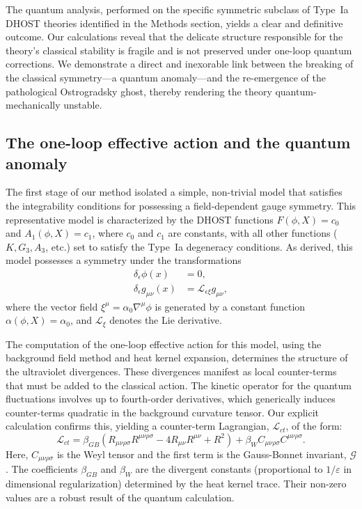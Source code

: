 \documentclass[twocolumn]{aastex631}
\begin{document}
The quantum analysis, performed on the specific symmetric subclass of Type~Ia DHOST theories identified in the Methods section, yields a clear and definitive outcome. Our calculations reveal that the delicate structure responsible for the theory's classical stability is fragile and is not preserved under one-loop quantum corrections. We demonstrate a direct and inexorable link between the breaking of the classical symmetry---a quantum anomaly---and the re-emergence of the pathological Ostrogradsky ghost, thereby rendering the theory quantum-mechanically unstable.

\subsection{The one-loop effective action and the quantum anomaly}
The first stage of our method isolated a simple, non-trivial model that satisfies the integrability conditions for possessing a field-dependent gauge symmetry. This representative model is characterized by the DHOST functions $F(\phi, X) = c_0$ and $A_1(\phi, X) = c_1$, where $c_0$ and $c_1$ are constants, with all other functions ($K, G_3, A_3$, etc.) set to satisfy the Type~Ia degeneracy conditions. As derived, this model possesses a symmetry under the transformations
\begin{align}
    \delta_\epsilon \phi(x) &= 0, \label{eq:symm_phi} \\
    \delta_\epsilon g_{\mu\nu}(x) &= \mathcal{L}_{\epsilon \xi} g_{\mu\nu}, \label{eq:symm_g}
\end{align}
where the vector field $\xi^\mu = \alpha_0 \nabla^\mu\phi$ is generated by a constant function $\alpha(\phi, X) = \alpha_0$, and $\mathcal{L}_{\xi}$ denotes the Lie derivative.

The computation of the one-loop effective action for this model, using the background field method and heat kernel expansion, determines the structure of the ultraviolet divergences. These divergences manifest as local counter-terms that must be added to the classical action. The kinetic operator for the quantum fluctuations involves up to fourth-order derivatives, which generically induces counter-terms quadratic in the background curvature tensor. Our explicit calculation confirms this, yielding a counter-term Lagrangian, $\mathcal{L}_{ct}$, of the form:
\begin{equation}
\label{eq:L_ct}
\mathcal{L}_{ct} = \beta_{GB} \left( R_{\mu\nu\rho\sigma}R^{\mu\nu\rho\sigma} - 4 R_{\mu\nu}R^{\mu\nu} + R^2 \right) + \beta_{W} C_{\mu\nu\rho\sigma}C^{\mu\nu\rho\sigma}.
\end{equation}
Here, $C_{\mu\nu\rho\sigma}$ is the Weyl tensor and the first term is the Gauss-Bonnet invariant, $\mathcal{G}$. The coefficients $\beta_{GB}$ and $\beta_{W}$ are the divergent constants (proportional to $1/\varepsilon$ in dimensional regularization) determined by the heat kernel trace. Their non-zero values are a robust result of the quantum calculation.
\end{document}
